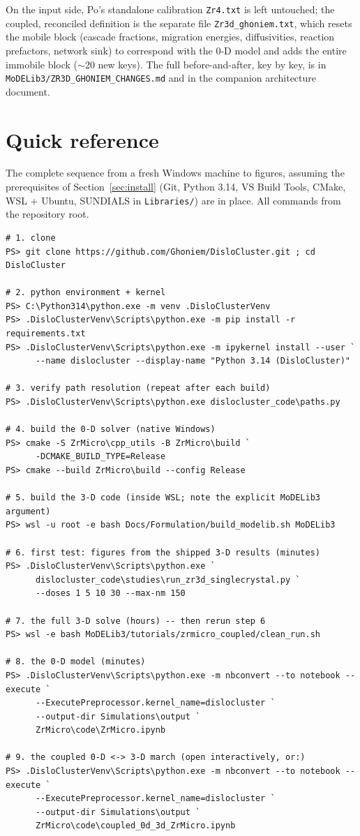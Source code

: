 \documentclass[11pt]{article}
\newcommand{\code}[1]{\texttt{\small #1}}
\newcommand{\file}[1]{\texttt{\footnotesize #1}}
\begin{document}
On the input side, Po's standalone calibration \file{Zr4.txt} is left
untouched; the coupled, reconciled definition is the separate file
\file{Zr3d\_ghoniem.txt}, which resets the mobile block (cascade fractions,
migration energies, diffusivities, reaction prefactors, network sink) to
correspond with the 0-D model and adds the entire immobile block ($\sim$20
new keys). The full before-and-after, key by key, is in
\file{MoDELib3/ZR3D\_GHONIEM\_CHANGES.md} and in the companion architecture
document.

\section{Quick reference}
\label{app:quickref}

The complete sequence from a fresh Windows machine to figures, assuming the
prerequisites of Section~\ref{sec:install} (Git, Python 3.14, VS Build
Tools, CMake, WSL + Ubuntu, SUNDIALS in \file{Libraries/}) are in place. All
commands from the repository root.

\begin{lstlisting}[style=ps]
# 1. clone
PS> git clone https://github.com/Ghoniem/DisloCluster.git ; cd DisloCluster

# 2. python environment + kernel
PS> C:\Python314\python.exe -m venv .DisloClusterVenv
PS> .DisloClusterVenv\Scripts\python.exe -m pip install -r requirements.txt
PS> .DisloClusterVenv\Scripts\python.exe -m ipykernel install --user `
      --name dislocluster --display-name "Python 3.14 (DisloCluster)"

# 3. verify path resolution (repeat after each build)
PS> .DisloClusterVenv\Scripts\python.exe dislocluster_code\paths.py

# 4. build the 0-D solver (native Windows)
PS> cmake -S ZrMicro\cpp_utils -B ZrMicro\build `
      -DCMAKE_BUILD_TYPE=Release
PS> cmake --build ZrMicro\build --config Release

# 5. build the 3-D code (inside WSL; note the explicit MoDELib3 argument)
PS> wsl -u root -e bash Docs/Formulation/build_modelib.sh MoDELib3

# 6. first test: figures from the shipped 3-D results (minutes)
PS> .DisloClusterVenv\Scripts\python.exe `
      dislocluster_code\studies\run_zr3d_singlecrystal.py `
      --doses 1 5 10 30 --max-nm 150

# 7. the full 3-D solve (hours) -- then rerun step 6
PS> wsl -e bash MoDELib3/tutorials/zrmicro_coupled/clean_run.sh

# 8. the 0-D model (minutes)
PS> .DisloClusterVenv\Scripts\python.exe -m nbconvert --to notebook --execute `
      --ExecutePreprocessor.kernel_name=dislocluster `
      --output-dir Simulations\output `
      ZrMicro\code\ZrMicro.ipynb

# 9. the coupled 0-D <-> 3-D march (open interactively, or:)
PS> .DisloClusterVenv\Scripts\python.exe -m nbconvert --to notebook --execute `
      --ExecutePreprocessor.kernel_name=dislocluster `
      --output-dir Simulations\output `
      ZrMicro\code\coupled_0d_3d_ZrMicro.ipynb
\end{lstlisting}
\end{document}

